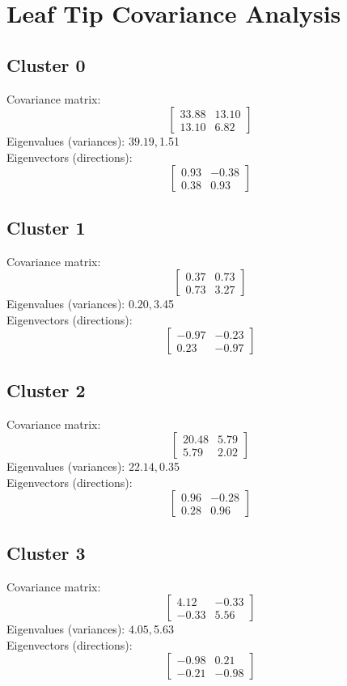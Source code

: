 \documentclass{article}
\begin{document}
\section*{Leaf Tip Covariance Analysis}
\subsection*{Cluster 0}
Covariance matrix:
\[\begin{bmatrix}33.88 & 13.10 \\13.10 & 6.82\end{bmatrix}\]
Eigenvalues (variances): $ 39.19, $1.51\\
Eigenvectors (directions):
\[\begin{bmatrix}0.93 & -0.38 \\0.38 & 0.93\end{bmatrix}\]
\subsection*{Cluster 1}
Covariance matrix:
\[\begin{bmatrix}0.37 & 0.73 \\0.73 & 3.27\end{bmatrix}\]
Eigenvalues (variances): $ 0.20, $3.45\\
Eigenvectors (directions):
\[\begin{bmatrix}-0.97 & -0.23 \\0.23 & -0.97\end{bmatrix}\]
\subsection*{Cluster 2}
Covariance matrix:
\[\begin{bmatrix}20.48 & 5.79 \\5.79 & 2.02\end{bmatrix}\]
Eigenvalues (variances): $ 22.14, $0.35\\
Eigenvectors (directions):
\[\begin{bmatrix}0.96 & -0.28 \\0.28 & 0.96\end{bmatrix}\]
\subsection*{Cluster 3}
Covariance matrix:
\[\begin{bmatrix}4.12 & -0.33 \\-0.33 & 5.56\end{bmatrix}\]
Eigenvalues (variances): $ 4.05, $5.63\\
Eigenvectors (directions):
\[\begin{bmatrix}-0.98 & 0.21 \\-0.21 & -0.98\end{bmatrix}\]
\end{document}
